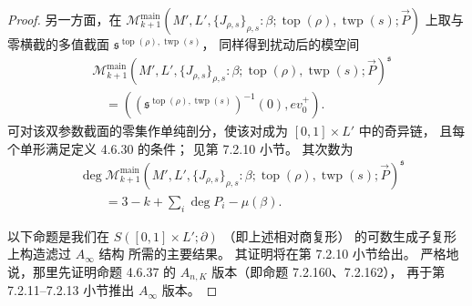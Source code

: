 \begin{proof}
另一方面，在
$\mathcal M_{k+1}^{\mathrm{main}}
(M',L',\{J_{\rho,s}\}_{\rho,s}:
\beta;\operatorname{top}(\rho),\operatorname{twp}(s);
\vec P)$
上取与零横截的多值截面
$\mathfrak s^{\operatorname{top}(\rho),\operatorname{twp}(s)}$，
同样得到扰动后的模空间
\[
\begin{aligned}
&\mathcal M_{k+1}^{\mathrm{main}}
(M',L',\{J_{\rho,s}\}_{\rho,s}:
\beta;\operatorname{top}(\rho),\operatorname{twp}(s);
\vec P)^{\mathfrak s}\\
&\quad=
((\mathfrak s^{\operatorname{top}(\rho),
\operatorname{twp}(s)})^{-1}(0),ev_0^+).
\end{aligned}
\]
可对该双参数截面的零集作单纯剖分，使该对成为
$[0,1]\times L'$ 中的奇异链，
且每个单形满足定义 4.6.30 的条件；
见第 7.2.10 小节。
其次数为
\begin{equation}
\begin{aligned}
&\deg\mathcal M_{k+1}^{\mathrm{main}}
(M',L',\{J_{\rho,s}\}_{\rho,s}:
\beta;\operatorname{top}(\rho),
\operatorname{twp}(s);\vec P)^{\mathfrak s}\\
&\qquad=3-k+\sum_i\deg P_i-\mu(\beta).
\end{aligned}
\tag{4.6.36.2}\label{eq:4-6-36-2}
\end{equation}

以下命题是我们在 $S([0,1]\times L';\partial)$
（即上述相对商复形）
的可数生成子复形上构造滤过 $A_\infty$ 结构
所需的主要结果。
其证明将在第 7.2.10 小节给出。
严格地说，那里先证明命题 4.6.37 的
$A_{n,K}$ 版本（即命题 7.2.160、7.2.162），
再于第 7.2.11--7.2.13 小节推出 $A_\infty$ 版本。


\end{proof}
